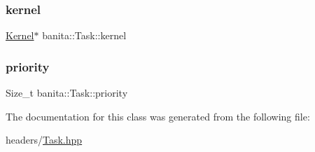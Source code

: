 \mbox{\label{classbanita_1_1_task_a6525188adf77e008e70e2b7cae631bd4}} 
\subsubsection{\texorpdfstring{kernel}{kernel}}
{\footnotesize\ttfamily \mbox{\hyperlink{classbanita_1_1_kernel}{Kernel}}$\ast$ banita\+::\+Task\+::kernel\hspace{0.3cm}{\ttfamily [protected]}}

\mbox{\label{classbanita_1_1_task_ad2bb89f0c32415917e5b336fdcd9fd5d}} 
\subsubsection{\texorpdfstring{priority}{priority}}
{\footnotesize\ttfamily Size\+\_\+t banita\+::\+Task\+::priority\hspace{0.3cm}{\ttfamily [protected]}}



The documentation for this class was generated from the following file\+:\begin{DoxyCompactItemize}
\item 
headers/\mbox{\hyperlink{_task_8hpp}{Task.\+hpp}}\end{DoxyCompactItemize}
